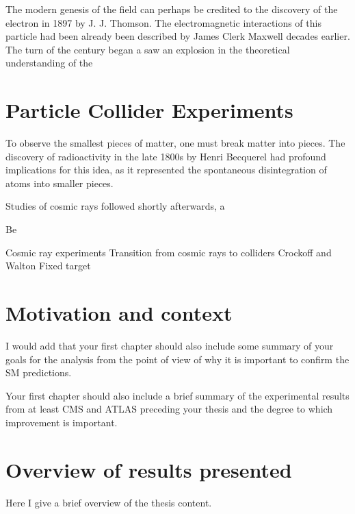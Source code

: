 The modern genesis of the field can perhaps be credited to 
the discovery of the electron in 1897 by J. J. Thomson.
The electromagnetic interactions of this particle had been 
already been described by James Clerk Maxwell decades earlier.
The turn of the century began a saw an explosion in the theoretical
understanding of the 

\section{Particle Collider Experiments}

To observe the smallest pieces of matter, one must break matter into pieces.
The discovery of radioactivity in the late 1800s by Henri Becquerel had
profound implications for this idea, as it represented the spontaneous
disintegration of atoms into smaller pieces.

Studies of cosmic rays followed shortly afterwards, a


Be

Cosmic ray experiments
Transition from cosmic rays to colliders
Crockoff and Walton
Fixed target

\section{Motivation and context}

I would add that your first chapter
should also include some summary of your
goals for the analysis from the point
of view of why it is important to confirm
the SM predictions.

Your first chapter should also include
a brief summary of the experimental
results from at least CMS and ATLAS
preceding your thesis and the degree
to which improvement is important.

\section{Overview of results presented}

Here I give a brief overview of the thesis content.

